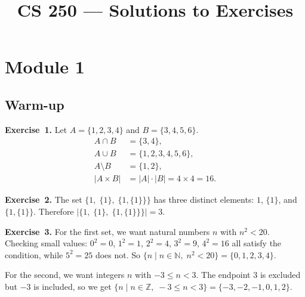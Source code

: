 \documentclass[11pt]{article}
\title{CS 250 --- Solutions to Exercises}
\author{}
\date{}
\begin{document}
\maketitle

\section*{Module 1}

\subsection*{Warm-up}

\textbf{Exercise~1.}
Let $A = \{1,2,3,4\}$ and $B = \{3,4,5,6\}$.
\begin{align*}
  A \cap B &= \{3, 4\}, \\
  A \cup B &= \{1, 2, 3, 4, 5, 6\}, \\
  A \setminus B &= \{1, 2\}, \\
  |A \times B| &= |A| \cdot |B| = 4 \times 4 = 16.
\end{align*}

\medskip
\textbf{Exercise~2.}
The set $\{1,\;\{1\},\;\{1,\{1\}\}\}$ has three distinct elements: $1$,
$\{1\}$, and $\{1,\{1\}\}$.  Therefore
$|\{1,\;\{1\},\;\{1,\{1\}\}\}| = 3$.

\medskip
\textbf{Exercise~3.}
For the first set, we want natural numbers $n$ with $n^2 < 20$. Checking
small values: $0^2 = 0$, $1^2 = 1$, $2^2 = 4$, $3^2 = 9$, $4^2 = 16$ all
satisfy the condition, while $5^2 = 25$ does not. So
$\{n \mid n \in \mathbb{N},\; n^2 < 20\} = \{0, 1, 2, 3, 4\}$.

For the second, we want integers $n$ with $-3 \leq n < 3$. The endpoint
$3$ is excluded but $-3$ is included, so we get
$\{n \mid n \in \mathbb{Z},\; -3 \leq n < 3\} = \{-3, -2, -1, 0, 1, 2\}$.
\end{document}

